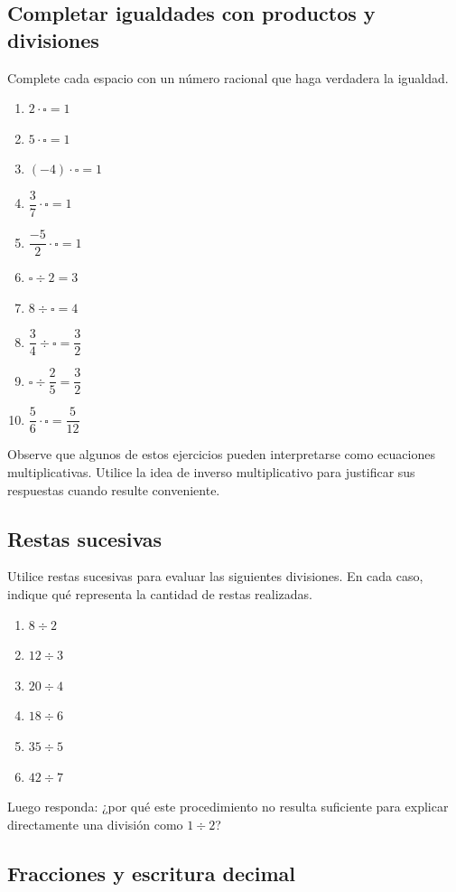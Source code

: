 \subsection*{Completar igualdades con productos y divisiones}

Complete cada espacio con un número racional que haga verdadera la igualdad.

\begin{enumerate}
\item \(2\cdot\square=1\)
\item \(5\cdot\square=1\)
\item \((-4)\cdot\square=1\)
\item \(\dfrac37\cdot\square=1\)
\item \(\dfrac{-5}{2}\cdot\square=1\)
\item \(\square\div2=3\)
\item \(8\div\square=4\)
\item \(\dfrac34\div\square=\dfrac32\)
\item \(\square\div\dfrac25=\dfrac32\)
\item \(\dfrac56\cdot\square=\dfrac{5}{12}\)
\end{enumerate}

Observe que algunos de estos ejercicios pueden interpretarse como ecuaciones multiplicativas. Utilice la idea de inverso multiplicativo para justificar sus respuestas cuando resulte conveniente.

\subsection*{Restas sucesivas}

Utilice restas sucesivas para evaluar las siguientes divisiones. En cada caso, indique qué representa la cantidad de restas realizadas.

\begin{enumerate}
\item \(8\div2\)
\item \(12\div3\)
\item \(20\div4\)
\item \(18\div6\)
\item \(35\div5\)
\item \(42\div7\)
\end{enumerate}

Luego responda: ¿por qué este procedimiento no resulta suficiente para explicar directamente una división como \(1\div2\)?

\subsection*{Fracciones y escritura decimal}


